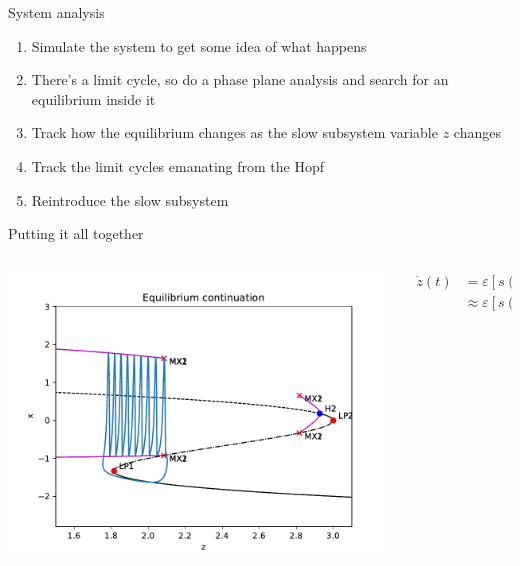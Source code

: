 \documentclass[presentation]{beamer}
\begin{document}
\begin{frame}[label={sec:orgbdd81d3}]{System analysis}
\begin{enumerate}
\item Simulate the system to get some idea of what happens
\item There's a limit cycle, so do a phase plane analysis and search for an equilibrium inside it
\item Track how the equilibrium changes as the slow subsystem variable \(z\) changes
\item Track the limit cycles emanating from the Hopf
\item Reintroduce the slow subsystem
\end{enumerate}
\end{frame}

\begin{frame}[label={sec:orgd41f1d9}]{Putting it all together}
\begin{columns}
\begin{column}{0.65\columnwidth}
\begin{center}
\includegraphics[height=.85\textheight]{./burster_diagram.pdf}
\end{center}
\end{column}

\begin{column}{0.35\columnwidth}
\begin{align}
\dot{z}(t) &= \varepsilon\left[s(x(t)-x_r)-z(t)\right]\nonumber \\
&\approx \varepsilon\left[s(\bar{x} - x_r)-z(t)\right]\nonumber
\end{align}
\end{column}
\end{columns}
\end{frame}
\end{document}
